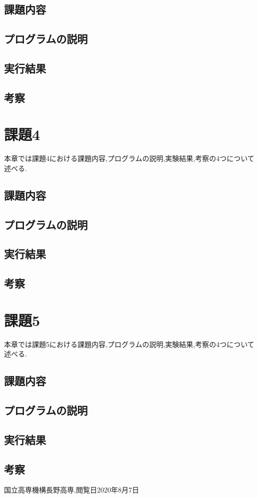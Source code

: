 \documentclass[dvipdfmx]{jarticle}
\begin{document}
    \subsection{課題内容}
    \subsection{プログラムの説明}
    \subsection{実行結果}
    \subsection{考察}

    \section{課題4}
    本章では課題4における課題内容,プログラムの説明,実験結果,考察の4つについて述べる.
    \subsection{課題内容}
    \subsection{プログラムの説明}
    \subsection{実行結果}
    \subsection{考察}

    \section{課題5}
    本章では課題5における課題内容,プログラムの説明,実験結果,考察の4つについて述べる.
    \subsection{課題内容}
    \subsection{プログラムの説明}
    \subsection{実行結果}
    \subsection{考察}

        \begin{thebibliography}{9}
            国立高専機構長野高専,閲覧日2020年8月7日
          \end{thebibliography}
\end{document}
